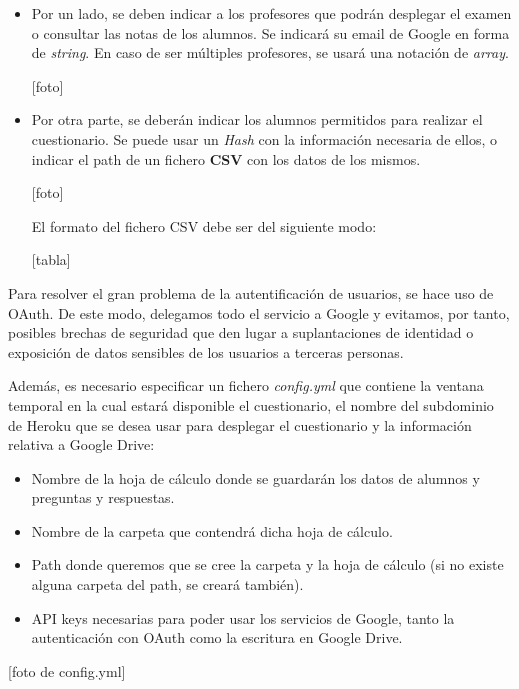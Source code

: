 \begin{itemize}
  \item Por un lado, se deben indicar a los profesores que podr\'an desplegar el examen o consultar las notas de los alumnos. Se indicar\'a
  su email de Google en forma de \textit{string}. En caso de ser m\'ultiples profesores, se usar\'a una notaci\'on de \textit{array}.
  
  [foto]
  
  \item Por otra parte, se deber\'an indicar los alumnos permitidos para realizar el cuestionario. Se puede usar un \textit{Hash} con 
  la informaci\'on necesaria de ellos, o indicar el path de un fichero {\bfseries CSV} con los datos de los mismos.
  
  [foto]
  \bigskip
  
  El formato del fichero CSV debe ser del siguiente modo:
  
  [tabla]
  
\end{itemize}

Para resolver el gran problema de la autentificaci\'on de usuarios, se hace uso de OAuth. De este modo, delegamos todo el servicio a Google y evitamos, por tanto,
posibles brechas de seguridad que den lugar a suplantaciones de identidad o exposici\'on de datos sensibles de los usuarios a terceras personas.
\bigskip

Adem\'as, es necesario especificar un fichero \textit{config.yml} que contiene la ventana temporal en la cual estar\'a disponible
el cuestionario, el nombre del subdominio de Heroku que se desea usar para desplegar el cuestionario y la informaci\'on relativa a Google Drive:
\begin{itemize}
  \item Nombre de la hoja de c\'alculo donde se guardar\'an los datos de alumnos y preguntas y respuestas.
  \item Nombre de la carpeta que contendr\'a dicha hoja de c\'alculo.
  \item Path donde queremos que se cree la carpeta y la hoja de c\'alculo (si no existe alguna carpeta del path, se crear\'a tambi\'en).
  \item API keys necesarias para poder usar los servicios de Google, tanto la autenticaci\'on con OAuth como la escritura en Google Drive.
\end{itemize}

[foto de config.yml]
\bigskip

